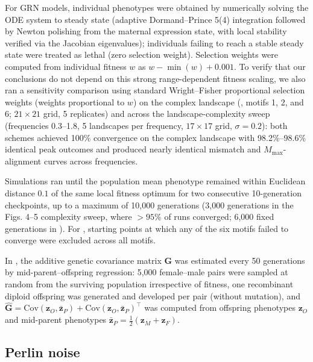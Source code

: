 For GRN models, individual phenotypes were obtained by numerically solving the ODE system to steady state (adaptive Dormand--Prince 5(4) integration followed by Newton polishing from the maternal expression state, with local stability verified via the Jacobian eigenvalues); individuals failing to reach a stable steady state were treated as lethal (zero selection weight).
Selection weights were computed from individual fitness $w$ as $w - \min(w) + 0.001$.
To verify that our conclusions do not depend on this strong range-dependent fitness scaling, we also ran a sensitivity comparison using standard Wright--Fisher proportional selection weights (weights proportional to $w$) on the complex landscape (, motifs 1, 2, and 6; $21 \times 21$ grid, 5 replicates) and across the landscape-complexity sweep (frequencies 0.3--1.8, 5 landscapes per frequency, $17 \times 17$ grid, $\sigma = 0.2$): both schemes achieved 100\% convergence on the complex landscape with 98.2\%--98.6\% identical peak outcomes and produced nearly identical mismatch and $M_{\max}$-alignment curves across frequencies.

Simulations ran until the population mean phenotype remained within Euclidean distance $0.1$ of the same local fitness optimum for two consecutive 10-generation checkpoints, up to a maximum of 10,000 generations (3,000 generations in the Figs. 4--5 complexity sweep, where $>95\%$ of runs converged; 6,000 fixed generations in ).
For , starting points at which any of the six motifs failed to converge were excluded across all motifs.

In , the additive genetic covariance matrix $\mathbf{G}$ was estimated every 50 generations by mid-parent--offspring regression: 5,000 female--male pairs were sampled at random from the surviving population irrespective of fitness, one recombinant diploid offspring was generated and developed per pair (without mutation), and $\hat{\mathbf{G}} = \mathrm{Cov}(\mathbf{z}_O, \bar{\mathbf{z}}_P) + \mathrm{Cov}(\mathbf{z}_O, \bar{\mathbf{z}}_P)^\top$ was computed from offspring phenotypes $\mathbf{z}_O$ and mid-parent phenotypes $\bar{\mathbf{z}}_P = \frac{1}{2}(\mathbf{z}_M + \mathbf{z}_F)$.

\subsection{Perlin noise}


